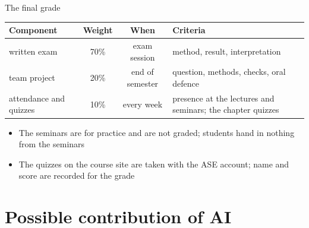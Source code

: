 \begin{frame}{The final grade}
\itemsize{\small}
\begin{center}
\footnotesize
\begin{tabular}{>{\raggedright\arraybackslash}p{3.2cm}cc>{\raggedright\arraybackslash}p{5.6cm}}
\toprule
\textbf{Component} & \textbf{Weight} & \textbf{When} & \textbf{Criteria} \\
\midrule
written exam & 70\% & exam session & method, result, interpretation \\
team project & 20\% & end of semester & question, methods, checks, oral defence \\
attendance and quizzes & 10\% & every week & presence at the lectures and seminars; the chapter quizzes \\
\bottomrule
\end{tabular}
\end{center}
\begin{itemize}
    \item The seminars are for practice and are not graded; students hand in nothing from the seminars
    \item The quizzes on the course site are taken with the ASE account; name and score are recorded for the grade
\end{itemize}
\end{frame}


\section{Possible contribution of AI}


